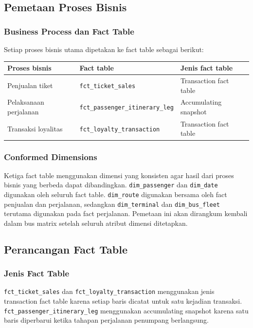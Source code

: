 \subsection{Pemetaan Proses Bisnis}
\subsubsection{Business Process dan Fact Table}

Setiap proses bisnis utama dipetakan ke fact table sebagai berikut:

\begin{center}
\begin{tabular}{|p{}|p{}|p{}|}
\hline
\textbf{Proses bisnis} & \textbf{Fact table} & \textbf{Jenis fact table} \\
\hline
Penjualan tiket & \texttt{fct\_ticket\_sales} & Transaction fact table \\
\hline
Pelaksanaan perjalanan & \texttt{fct\_passenger\_itinerary\_leg} & Accumulating snapshot \\
\hline
Transaksi loyalitas & \texttt{fct\_loyalty\_transaction} & Transaction fact table \\
\hline
\end{tabular}
\end{center}

\subsubsection{Conformed Dimensions}

Ketiga fact table menggunakan dimensi yang konsisten agar hasil dari proses bisnis
yang berbeda dapat dibandingkan. \texttt{dim\_passenger} dan \texttt{dim\_date}
digunakan oleh seluruh fact table. \texttt{dim\_route} digunakan bersama oleh fact
penjualan dan perjalanan, sedangkan \texttt{dim\_terminal} dan
\texttt{dim\_bus\_fleet} terutama digunakan pada fact perjalanan. Pemetaan ini akan
dirangkum kembali dalam bus matrix setelah seluruh atribut dimensi ditetapkan.

\subsection{Perancangan Fact Table}
\subsubsection{Jenis Fact Table}

\texttt{fct\_ticket\_sales} dan \texttt{fct\_loyalty\_transaction} menggunakan
jenis transaction fact table karena setiap baris dicatat untuk satu kejadian
transaksi. \texttt{fct\_passenger\_itinerary\_leg} menggunakan accumulating snapshot
karena satu baris diperbarui ketika tahapan perjalanan penumpang berlangsung.


